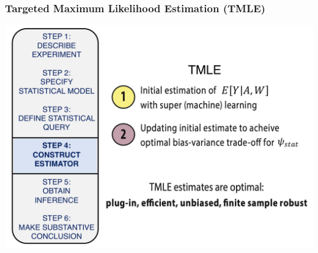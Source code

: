 \documentclass[t]{beamer}
\begin{document}
\begin{frame}
  \frametitle{Targeted Maximum Likelihood Estimation (TMLE)}
  \vspace{-20pt}
  \begin{center}
  \includegraphics[width = 1.05\textwidth]{figures/roadmap4_1.pdf}
  \end{center}
\end{frame}
\end{document}
